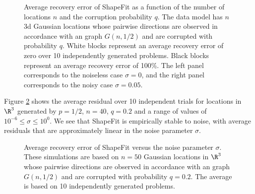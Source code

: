 \begin{figure} 
\begin{center}
{\large

}
\end{center}
\caption{Average recovery error of ShapeFit as a function of the number of locations $n$ and the corruption probability $q$.  The data model has $n$ 3d Gaussian locations whose pairwise directions are observed in accordance with an \erdosrenyi graph $G(n, 1/2)$ and are corrupted with probability $q$.   White blocks represent an average recovery error of zero over 10 independently generated problems.  Black blocks represent an average recovery error of 100\%.   The left panel corresponds to the noiseless case $\sigma = 0$, and the right panel corresponds to the noisy case $\sigma = 0.05$.  
}
\label{fig-phase-transition}
\end{figure}

Figure \ref{fig-robustness} shows the average residual over 10 independent trials for locations in $\R^3$ generated by $p = 1/2$, $n = 40$, $q= 0.2$ and a range of values of $10^{-6} \leq \sigma \leq 10^0$.  We see that ShapeFit is empirically stable to noise, with average residuals that are approximately linear in the noise parameter $\sigma$.
 
\begin{figure}
\begin{center}
{\large

}
\end{center}
\caption{
Average recovery error of ShapeFit versus the noise parameter $\sigma$.  These simulations are based on $n=50$  Gaussian locations in $\R^3$ whose pairwise directions are observed in accordance with an \erdosrenyi graph $G(n,1/2)$ and are corrupted with probability $q=0.2$.  The average is based on 10 independently generated problems.
}
 \label{fig-robustness}
\end{figure}

